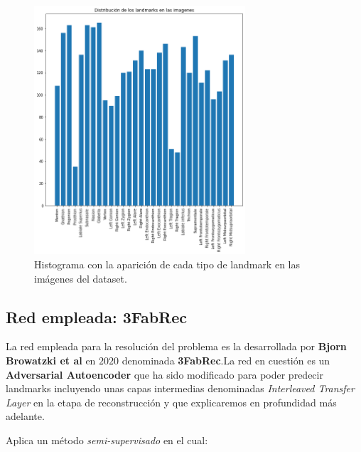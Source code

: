                \begin{figure}[!h]
                    \centering
                    \includegraphics[width=0.7\textwidth]{img/distribucion_landmarks_imagenes.png}
                    \caption{Histograma con la aparición de cada tipo de landmark en las imágenes del dataset.}
                    \label{fig:Histograma}
                \end{figure}
                
        \subsection{Red empleada: 3FabRec}
            \noindent La red empleada para la resolución del problema es la desarrollada por \textbf{Bjorn Browatzki et al} en $2020$ \cite{browatzki20203fabrec} denominada \textbf{3FabRec}.La red en cuestión es un \textbf{Adversarial Autoencoder} que ha sido modificado para poder predecir landmarks incluyendo unas capas intermedias denominadas \textit{Interleaved Transfer Layer} en la etapa de reconstrucción y que explicaremos en profundidad más adelante.            

            \medskip

            \noindent Aplica un método \textit{semi-supervisado} en el cual:
            
